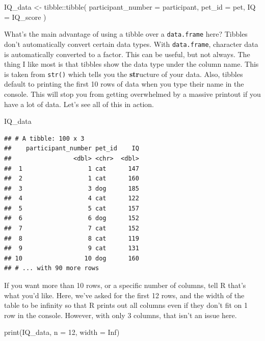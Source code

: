\documentclass[
]{book}
\newenvironment{Shaded}{\begin{snugshade}}{\end{snugshade}}
\newcommand{\AttributeTok}[1]{\textcolor[rgb]{0.77,0.63,0.00}{#1}}
\newcommand{\ConstantTok}[1]{\textcolor[rgb]{0.00,0.00,0.00}{#1}}
\newcommand{\DecValTok}[1]{\textcolor[rgb]{0.00,0.00,0.81}{#1}}
\newcommand{\FunctionTok}[1]{\textcolor[rgb]{0.00,0.00,0.00}{#1}}
\newcommand{\NormalTok}[1]{#1}
\newcommand{\OtherTok}[1]{\textcolor[rgb]{0.56,0.35,0.01}{#1}}
\newcommand{\SpecialCharTok}[1]{\textcolor[rgb]{0.00,0.00,0.00}{#1}}
\begin{document}
\begin{Shaded}
\begin{Highlighting}[]
\NormalTok{IQ\_data }\OtherTok{\textless{}{-}}\NormalTok{ tibble}\SpecialCharTok{::}\FunctionTok{tibble}\NormalTok{(}
  \AttributeTok{participant\_number =}\NormalTok{ participant, }
  \AttributeTok{pet\_id =}\NormalTok{ pet, }
  \AttributeTok{IQ =}\NormalTok{ IQ\_score}
\NormalTok{  )}
\end{Highlighting}
\end{Shaded}

What's the main advantage of using a tibble over a \texttt{data.frame} here? Tibbles don't automatically convert certain data types. With \texttt{data.frame}, character data is automatically converted to a factor. This can be useful, but not always. The thing I like most is that tibbles show the data type under the column name. This is taken from \texttt{str()} which tells you the \textbf{str}ucture of your data. Also, tibbles default to printing the first 10 rows of data when you type their name in the console. This will stop you from getting overwhelmed by a massive printout if you have a lot of data. Let's see all of this in action.

\begin{Shaded}
\begin{Highlighting}[]
\NormalTok{IQ\_data}
\end{Highlighting}
\end{Shaded}

\begin{verbatim}
## # A tibble: 100 x 3
##    participant_number pet_id    IQ
##                 <dbl> <chr>  <dbl>
##  1                  1 cat      147
##  2                  1 cat      160
##  3                  3 dog      185
##  4                  4 cat      122
##  5                  5 cat      157
##  6                  6 dog      152
##  7                  7 cat      152
##  8                  8 cat      119
##  9                  9 cat      131
## 10                 10 dog      160
## # ... with 90 more rows
\end{verbatim}

If you want more than 10 rows, or a specific number of columns, tell R that's what you'd like. Here, we've asked for the first 12 rows, and the width of the table to be infinity so that R prints out all columns even if they don't fit on 1 row in the console. However, with only 3 columns, that isn't an issue here.

\begin{Shaded}
\begin{Highlighting}[]
\FunctionTok{print}\NormalTok{(IQ\_data, }\AttributeTok{n =} \DecValTok{12}\NormalTok{, }\AttributeTok{width =} \ConstantTok{Inf}\NormalTok{)}
\end{Highlighting}
\end{Shaded}
\end{document}
